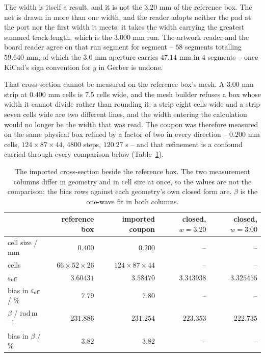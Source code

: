 The width is itself a result, and it is not the $3.20$ mm of the reference box. The net is drawn in more than one
width, and the reader adopts neither the pad at the port nor the first width it meets: it takes the width
carrying the greatest summed track length, which is the $3.000$ mm run. The artwork reader and the board reader
agree on that run segment for segment -- $58$ segments totalling $59.640$ mm, of which the $3.0$ mm aperture
carries $47.14$ mm in $4$ segments -- once KiCad's sign convention for $y$ in Gerber is undone.

That cross-section cannot be measured on the reference box's mesh. A $3.00$ mm strip at $0.400$ mm cells is
$7.5$ cells wide, and the mesh builder refuses a box whose width it cannot divide rather than rounding it: a
strip eight cells wide and a strip seven cells wide are two different lines, and the width entering the
calculation would no longer be the width that was read. The coupon was therefore measured on the same physical
box refined by a factor of two in every direction -- $0.200$ mm cells, $124\times87\times44$, $4800$ steps,
$120.27$ s -- and that refinement is a confound carried through every comparison below
(Table~\ref{tab:ms-import}).

\begin{table}[H]
  \centering
  \caption{The imported cross-section beside the reference box. The two measurement columns differ in geometry and
  in cell size at once, so the values are not the comparison; the bias rows against each geometry's own closed
  form are. $\beta$ is the one-wave fit in both columns.}
  \label{tab:ms-import}
  \begin{tabular}{@{}lrrrr@{}}
    \toprule
    & reference box & imported coupon & closed, $w=3.20$ & closed, $w=3.00$ \\
    \midrule
    cell size / mm & $0.400$ & $0.200$ & -- & -- \\
    cells & $66\times52\times26$ & $124\times87\times44$ & -- & -- \\
    $\varepsilon_{\mathrm{eff}}$ & $3.60431$ & $3.58470$ & $3.343938$ & $3.325455$ \\
    bias in $\varepsilon_{\mathrm{eff}}$ / \% & $7.79$ & $7.80$ & -- & -- \\
    $\beta$ / rad\,m$^{-1}$ & $231.886$ & $231.254$ & $223.353$ & $222.735$ \\
    bias in $\beta$ / \% & $3.82$ & $3.82$ & -- & -- \\
    \bottomrule
  \end{tabular}
\end{table}

